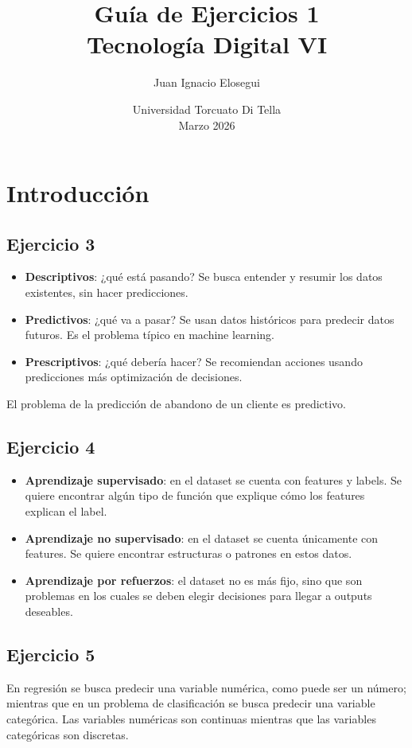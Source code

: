 \documentclass[a4paper,12pt]{article}
\title{\vspace{-2cm}\textbf{Guía de Ejercicios 1}\\[0.2cm]
\large Tecnología Digital VI}
\author{Juan Ignacio Elosegui}
\date{Universidad Torcuato Di Tella \\ Marzo 2026}
\begin{document}
    \maketitle
    \section*{Introducción}
        \subsection*{Ejercicio 3}
            \begin{itemize}
                \item \textbf{Descriptivos}: ¿qué está pasando? Se busca entender y resumir los datos existentes, sin hacer predicciones.
                \item \textbf{Predictivos}: ¿qué va a pasar? Se usan datos históricos para predecir datos futuros. Es el problema típico en machine learning.
                \item \textbf{Prescriptivos}: ¿qué debería hacer? Se recomiendan acciones usando predicciones más optimización de decisiones.
            \end{itemize}
            \noindent El problema de la predicción de abandono de un cliente es predictivo.
        \subsection*{Ejercicio 4}
            \begin{itemize}
                \item \textbf{Aprendizaje supervisado}: en el dataset se cuenta con features y labels. Se quiere encontrar algún tipo de función que explique cómo los features explican el label.
                \item \textbf{Aprendizaje no supervisado}: en el dataset se cuenta únicamente con features. Se quiere encontrar estructuras o patrones en estos datos.
                \item \textbf{Aprendizaje por refuerzos}: el dataset no es más fijo, sino que son problemas en los cuales se deben elegir decisiones para llegar a outputs deseables.
            \end{itemize}
        \subsection*{Ejercicio 5}
            \noindent En regresión se busca predecir una variable numérica, como puede ser un número; mientras que en un problema de clasificación se busca predecir una variable categórica. Las variables numéricas son continuas mientras que las variables categóricas son discretas.
\end{document}
